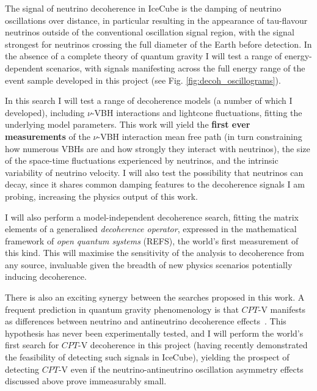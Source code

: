 \documentclass[a4paper,11pt]{article}
\begin{document}
The signal of neutrino decoherence in IceCube is the damping of neutrino oscillations over distance, in particular resulting in the appearance of tau-flavour neutrinos outside of the conventional oscillation signal region, with the signal strongest for neutrinos crossing the full diameter of the Earth before detection. In the absence of a complete theory of quantum gravity I will test a range of energy-dependent scenarios, with signals manifesting across the full energy range of the event sample developed in this project (see Fig. \ref{fig:decoh_oscillograms}).

In this search I will test a range of decoherence models (a number of which I developed), including $\nu$-VBH interactions and lightcone fluctuations, fitting the underlying model parameters. This work will yield the \textbf{first ever measurements} of the $\nu$-VBH interaction mean free path (in turn constraining how numerous VBHs are and how strongly they interact with neutrinos), the size of the space-time fluctuations experienced by neutrinos, and the intrinsic variability of neutrino velocity. I will also test the possibility that neutrinos can decay, since it shares common damping features to the decoherence signals I am probing, increasing the physics output of this work.

I will also perform a model-independent decoherence search, fitting the matrix elements of a generalised \textit{decoherence operator}, expressed in the mathematical framework of \textit{open quantum systems} (REFS), the world's first measurement of this kind. This will maximise the sensitivity of the analysis to decoherence from any source, invaluable given the breadth of new physics scenarios potentially inducing decoherence. 


There is also an exciting synergy between the searches proposed in this work. A frequent prediction in quantum gravity phenomenology is that $CPT$-V manifests as differences between neutrino and antineutrino decoherence effects~\cite{Mavromatos_2009, Barenboim:2004wu, Carrasco:2018sca, Buoninfante:2020iyr, Capolupo:2020myw}. This hypothesis has never been experimentally tested, and I will perform the world's first search for $CPT$-V decoherence in this project (having recently demonstrated the feasibility of detecting such signals in IceCube), yielding the prospect of detecting $CPT$-V even if the neutrino-antineutrino oscillation asymmetry effects discussed above prove immeasurably small.
\end{document}
